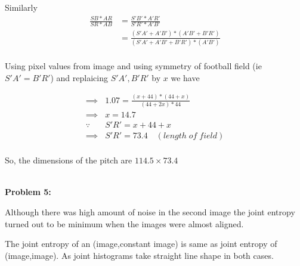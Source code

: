 \documentclass[a4paper]{article}
\begin{document}
Similarly
\begin{equation*} 
\begin{split}
 \frac{SB*AR}{SR*AB} &= \frac{S'B'*A'R'}{S'R'*A'B'} \\
\ &= \frac{(S'A'+A'B')*(A'B'+B'R')}{(S'A'+A'B'+B'R')*(A'B')} \\
 \end{split}
\end{equation*}

Using pixel values from image and using symmetry of football field (ie $S'A' = B'R'$) and replaicing $S'A',B'R'$ by $x$  we have

\begin{equation*} 
\begin{split}
\implies & 1.07 = \frac{(x+44)*(44+x)}{(44+2x)*44}\\
\implies & x = 14.7\\
\because \quad & S'R' = x+44+x \\
\implies & S'R' = 73.4 \quad (length \; of \; field)\\
 \end{split}
\end{equation*}

So, the dimensions of the pitch are $114.5 \times 73.4$


\hrulefill \\


\textbf{\newline Problem 5:}

Although there was high amount of noise in the second image the joint entropy turned out to be minimum when the images were almost aligned.

The joint entropy of an (image,constant image) is same as joint entropy of (image,image). As joint histograms take straight line shape in both cases.   
\end{document}
